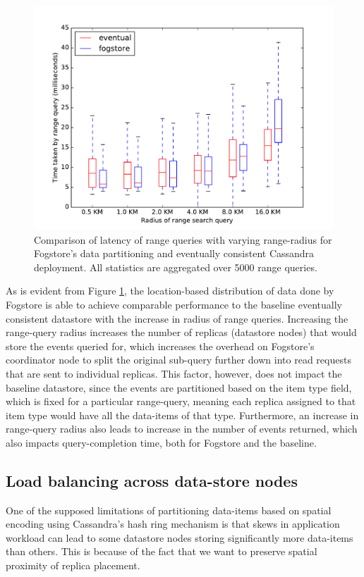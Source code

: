 \begin{figure}[h]
\centering
\includegraphics[width=0.75\columnwidth]{figures/fogstore/evals/scan/compWithEventual.pdf}
\caption{Comparison of latency of range queries with varying range-radius for Fogstore's data partitioning and eventually consistent Cassandra deployment. All statistics are aggregated over 5000 range queries.}
\label{fig:scan}
\end{figure}
\par As is evident from Figure \ref{fig:scan}, the location-based distribution of data done by Fogstore is able to achieve comparable performance to the baseline eventually consistent datastore with the increase in radius of range queries. Increasing the range-query radius increases the number of replicas (datastore nodes) that would store the events queried for, which increases the overhead on Fogstore's coordinator node to split the original sub-query further down into read requests that are sent to individual replicas. This factor, however, does not impact the baseline datastore, since the events are partitioned based on the item type field, which is fixed for a particular range-query, meaning each replica assigned to that item type would have all the data-items of that type. Furthermore, an increase in range-query radius also leads to increase in the number of events returned, which also impacts query-completion time, both for Fogstore and the baseline.

\subsection{Load balancing across data-store nodes}
One of the supposed limitations of partitioning data-items based on spatial encoding using Cassandra's hash ring mechanism is that skews in application workload can lead to some datastore nodes storing significantly more data-items than others. This is because of the fact that we want to preserve spatial proximity of replica placement. 

